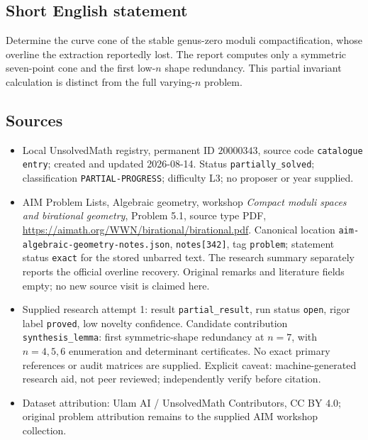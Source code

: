 \documentclass[11pt]{article}
\begin{document}
\subsection{Short English statement}
Determine the curve cone of the stable genus-zero moduli compactification, whose overline the extraction reportedly lost. The report computes only a symmetric seven-point cone and the first low-$n$ shape redundancy. This partial invariant calculation is distinct from the full varying-$n$ problem.
\subsection{Sources}
\begin{itemize}
\item Local UnsolvedMath registry, permanent ID $20000343$, source code \texttt{catalogue entry}; created and updated 2026-08-14. Status \texttt{partially\_solved}; classification \texttt{PARTIAL-PROGRESS}; difficulty L3; no proposer or year supplied.
\item AIM Problem Lists, Algebraic geometry, workshop \emph{Compact moduli spaces and birational geometry}, Problem 5.1, source type PDF, \url{https://aimath.org/WWN/birational/birational.pdf}. Canonical location \texttt{aim-algebraic-geometry-notes.json}, \texttt{notes[342]}, tag \texttt{problem}; statement status \texttt{exact} for the stored unbarred text. The research summary separately reports the official overline recovery. Original remarks and literature fields empty; no new source visit is claimed here.
\item Supplied research attempt 1: result \texttt{partial\_result}, run status \texttt{open}, rigor label \texttt{proved}, low novelty confidence. Candidate contribution \texttt{synthesis\_lemma}: first symmetric-shape redundancy at $n=7$, with $n=4,5,6$ enumeration and determinant certificates. No exact primary references or audit matrices are supplied. Explicit caveat: machine-generated research aid, not peer reviewed; independently verify before citation.
\item Dataset attribution: Ulam AI / UnsolvedMath Contributors, CC BY 4.0; original problem attribution remains to the supplied AIM workshop collection.
\end{itemize}
\end{document}
